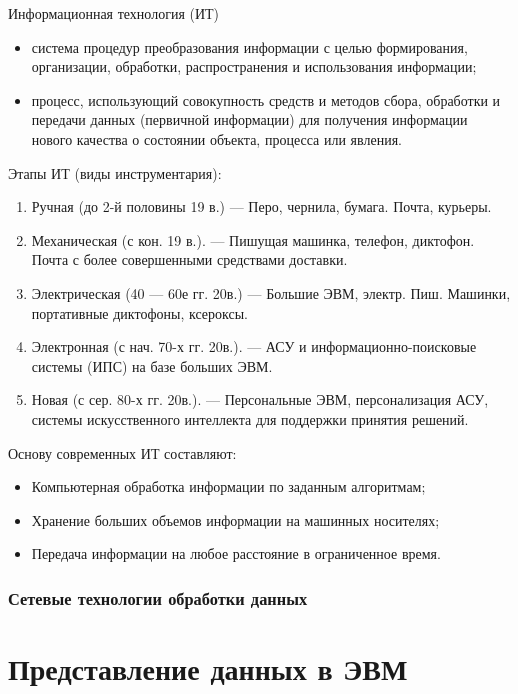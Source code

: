 \documentclass[a4paper]{article}
\begin{document}
  Информационная технология (ИТ)
  \begin{itemize}
      \item система процедур преобразования информации с целью формирования, организации, обработки, распространения и использования информации;
      \item процесс, использующий совокупность средств и методов сбора, обработки и передачи данных (первичной информации) для получения информации нового качества о состоянии объекта, процесса или явления.
\end{itemize}
Этапы ИТ (виды инструментария):
\begin{enumerate}
  \item Ручная  (до 2-й половины 19 в.) --- Перо, чернила, бумага. Почта, курьеры.
  \item Механическая (с кон. 19 в.). --- Пишущая машинка, телефон, диктофон. Почта с более совершенными средствами доставки.
  \item Электрическая (40 --- 60е гг. 20в.) --- Большие ЭВМ, электр. Пиш. Машинки, портативные диктофоны, ксероксы.
  \item  Электронная (с нач. 70-х гг. 20в.). --- АСУ и информационно-поисковые системы (ИПС) на базе больших ЭВМ.
  \item Новая (с сер. 80-х гг. 20в.). --- Персональные ЭВМ, персонализация АСУ, системы искусственного интеллекта для поддержки принятия решений.
\end{enumerate}

Основу современных ИТ составляют:
\begin{itemize}
  \item Компьютерная обработка информации по заданным алгоритмам;
  \item Хранение больших объемов информации на машинных носителях;
  \item Передача информации на любое расстояние в ограниченное время.
\end{itemize}

\subsubsection{Сетевые технологии обработки данных}

\section{Представление данных в ЭВМ}
\end{document}
